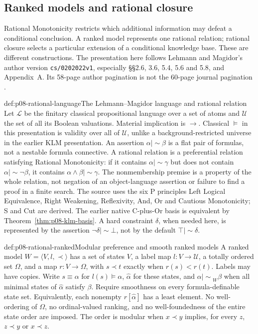 \subsection{Ranked models and rational closure}
\label{sec:p08-ranked-models-rational-closure}

Rational Monotonicity restricts which additional information may defeat a
conditional conclusion. A ranked model represents one rational relation;
rational closure selects a particular extension of a conditional knowledge
base. These are different constructions. The presentation here follows
Lehmann and Magidor's author version \texttt{cs/0202022v1}, especially
\S\S2.6, 3.6, 5.4, 5.6 and 5.8, and Appendix~A. Its 58-page author
pagination is not the 60-page journal pagination
\cite{LehmannMagidor1992,LehmannMagidor2002Author}.

\begin{hbdefinition}{def:p08-rational-language}{The Lehmann--Magidor language and rational relation}
Let \(\mathcal L\) be the finitary classical propositional language over
a set of atoms and \(\mathcal U\) the set of all its Boolean valuations.
Material implication is \(\to\). Classical \(\models\) in this
presentation is validity over all of \(\mathcal U\), unlike a
background-restricted universe in the earlier KLM presentation.
An assertion \(\alpha\mathrel{|\!\sim}\beta\) is a flat pair of
formulas, not a nestable formula connective. A rational relation is a
preferential relation satisfying Rational Monotonicity: if it contains
\(\alpha\mathrel{|\!\sim}\gamma\) but does not contain
\(\alpha\mathrel{|\!\sim}\neg\beta\), it contains
\(\alpha\wedge\beta\mathrel{|\!\sim}\gamma\).
The nonmembership premise is a property of the whole relation, not
negation of an object-language assertion or failure to find a proof in a
finite search. The source uses the six P principles Left Logical
Equivalence, Right Weakening, Reflexivity, And, Or and Cautious
Monotonicity; S and Cut are derived. The earlier native C-plus-Or basis
is equivalent by Theorem~\ref{thm:p08-klm-basis}.
A hard constraint \(\delta\), when needed here, is represented by the
assertion \(\neg\delta\mathrel{|\!\sim}\bot\), not by the
default \(\top\mathrel{|\!\sim}\delta\).
\end{hbdefinition}

\begin{hbdefinition}{def:p08-rational-ranked}{Modular preference and smooth ranked models}
A ranked model \(W=\langle V,l,\prec\rangle\) has a set of states
\(V\), a label map \(l:V\to\mathcal U\), a totally ordered set
\(\Omega\), and a map \(r:V\to\Omega\), with
\(s\prec t\) exactly when \(r(s)<r(t)\).
Labels may have copies. Write \(s\equiv\alpha\) for
\(l(s)\models\alpha\), \(\widehat\alpha\) for these states,
and \(\alpha\mathrel{|\!\sim}_W\beta\) when all minimal
states of \(\widehat\alpha\) satisfy \(\beta\).
Require smoothness on every formula-definable state set. Equivalently,
each nonempty \(r[\widehat\alpha]\) has a least element.
No well-ordering of \(\Omega\), no ordinal-valued ranking, and no
well-foundedness of the entire state order are imposed.
The order is modular when \(x\prec y\) implies, for every \(z\),
\(z\prec y\) or \(x\prec z\).
\end{hbdefinition}

